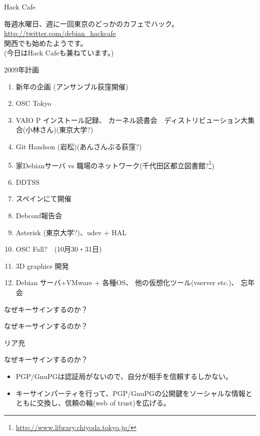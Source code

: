\begin{frame}{Hack Cafe}

毎週水曜日、週に一回東京のどっかのカフェでハック。\\
\url{http://twitter.com/debian_hackcafe}\\
関西でも始めたようです。\\
(今日はHack Cafeも兼ねています。)
\end{frame}

\begin{frame}{2009年計画}

{\scriptsize
 \begin{enumerate}
  \item 新年の企画 (アンサンブル荻窪開催)
  \item OSC Tokyo
  \item VAIO P インストール記録、
	カーネル読書会　ディストリビューション大集合(小林さん)(東京大学?)
  \item Git Handson (岩松)(あんさんぶる荻窪?)
  \item 家Debianサーバ vs 職場のネットワーク(千代田区都立図書館?\footnote{\url{http://www.library.chiyoda.tokyo.jp/}})
  \item DDTSS 
  \item スペインにて開催
  \item Debconf報告会
  \item Asterisk (東京大学?)、udev + HAL
  \item OSC Fall?　(10月30・31日)
  \item 3D graphics 開発 
  \item Debian サーバ+VMware + 各種OS、
	他の仮想化ツール(vserver etc.)、
	忘年会
 \end{enumerate}
}
\end{frame}

\begin{frame}{なぜキーサインするのか？}

\end{frame}

\begin{frame}{なぜキーサインするのか？}
\begin{center}
\Huge リア充
\end{center}
\end{frame}

\begin{frame}{なぜキーサインするのか？}
\begin{itemize}
\item PGP/GnuPGは認証局がないので、自分が相手を信頼するしかない。
\item キーサインパーティを行って、PGP/GnuPGの公開鍵をソーシャルな情報とともに交換し、信頼の輪(web of
 trust)を広げる。
\end{itemize}
\end{frame}

